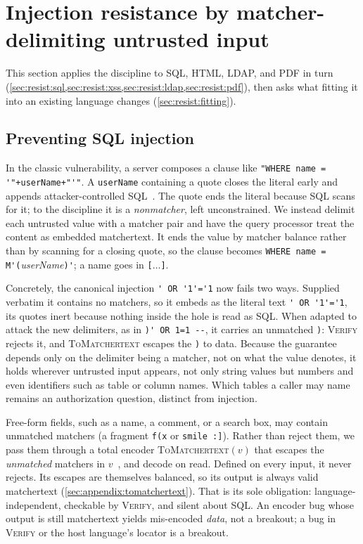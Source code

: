 \section{Injection resistance by matcher-delimiting untrusted input}
\label{sec:resist}

This section applies the discipline to SQL, HTML, LDAP, and PDF in turn
(\cref{sec:resist:sql,sec:resist:xss,sec:resist:ldap,sec:resist:pdf}), then
asks what fitting it into an existing language changes (\cref{sec:resist:fitting}).

\subsection{Preventing SQL injection}
\label{sec:resist:sql}

In the classic vulnerability, a server composes a clause like \verb|"WHERE name = '"+userName+"'"|.
A \verb|userName| containing a quote closes the literal early and appends
attacker-controlled SQL~\cite{clarke12sql}.
The quote ends the literal because SQL scans for it; to the discipline it is a
\emph{nonmatcher}, left unconstrained.
We instead delimit each untrusted value with a matcher pair and have the query
processor treat the content as embedded matchertext.
It ends the value by matcher balance rather than by scanning for a closing quote,
so the clause becomes \verb|WHERE name = M'(|\textit{userName}\verb|)'|; a name
goes in \verb|[|$\dots$\verb|]|.

Concretely, the canonical injection \verb|' OR '1'='1| now fails two ways.
Supplied verbatim it contains no matchers, so it embeds as the literal text
\verb|' OR '1'='1|, its quotes inert because nothing inside the hole
is read as SQL.
When adapted to attack the new delimiters, as in \verb|)' OR 1=1 --|, it carries
an unmatched \verb|)|: \textsc{Verify} rejects it, and \textsc{ToMatchertext}
escapes the \verb|)| to data.
Because the guarantee depends only on the delimiter being a matcher, not on what
the value denotes, it holds wherever untrusted input appears, not only string
values but numbers and even identifiers such as table or column names.
Which tables a caller may name remains an authorization question, distinct from
injection.

Free-form fields, such as a name, a comment, or a search box, may contain
unmatched matchers (\eg a fragment \verb|f(x| or \verb|smile :]|).
Rather than reject them, we pass them through a total encoder
\textsc{ToMatchertext}$(v)$ that escapes the \emph{unmatched} matchers in
$v$~\cite{matchertext}, and decode on read.
Defined on every input, it never rejects. Its escapes are themselves balanced,
so its output is always valid matchertext (\cref{sec:appendix:tomatchertext}).
That is its sole obligation: language-independent, checkable by \textsc{Verify},
and silent about SQL.
An encoder bug whose output is still matchertext yields mis-encoded \emph{data},
not a breakout; a bug in \textsc{Verify} or the host language's locator is a
breakout.

